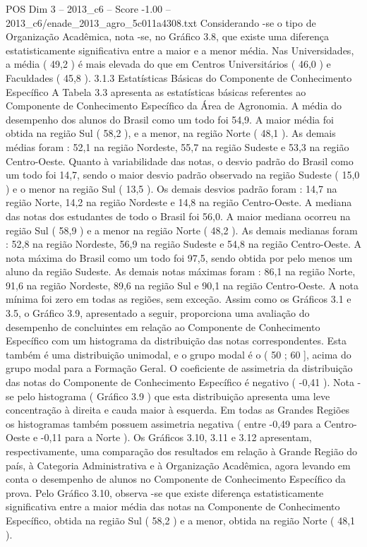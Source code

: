 \begin{textsample}{POS Dim 3 – 2013\_c6 – Score -1.00 – 2013\_c6/enade\_2013\_agro\_5c011a4308.txt}
Considerando -se o tipo de Organização Acadêmica, nota -se, no Gráfico 3.8, que existe uma diferença estatisticamente significativa entre a maior e a menor média.
Nas Universidades, a média ( 49,2 ) é mais elevada do que em Centros Universitários ( 46,0 ) e Faculdades ( 45,8 ). 3.1.3 Estatísticas Básicas do Componente de Conhecimento Específico A Tabela 3.3 apresenta as estatísticas básicas referentes ao Componente de Conhecimento Específico da Área de Agronomia.
A média do desempenho dos alunos do Brasil como um todo foi 54,9.
A maior média foi obtida na região Sul ( 58,2 ), e a menor, na região Norte ( 48,1 ).
As demais médias foram : 52,1 na região Nordeste, 55,7 na região Sudeste e 53,3 na região Centro-Oeste.
Quanto à variabilidade das notas, o desvio padrão do Brasil como um todo foi 14,7, sendo o maior desvio padrão observado na região Sudeste ( 15,0 ) e o menor na região Sul ( 13,5 ).
Os demais desvios padrão foram : 14,7 na região Norte, 14,2 na região Nordeste e 14,8 na região Centro-Oeste.
A mediana das notas dos estudantes de todo o Brasil foi 56,0.
A maior mediana ocorreu na região Sul ( 58,9 ) e a menor na região Norte ( 48,2 ).
As demais medianas foram : 52,8 na região Nordeste, 56,9 na região Sudeste e 54,8 na região Centro-Oeste.
A nota máxima do Brasil como um todo foi 97,5, sendo obtida por pelo menos um aluno da região Sudeste.
As demais notas máximas foram : 86,1 na região Norte, 91,6 na região Nordeste, 89,6 na região Sul e 90,1 na região Centro-Oeste.
A nota mínima foi zero em todas as regiões, sem exceção.
Assim como os Gráficos 3.1 e 3.5, o Gráfico 3.9, apresentado a seguir, proporciona uma avaliação do desempenho de concluintes em relação ao Componente de Conhecimento Específico com um histograma da distribuição das notas correspondentes.
Esta também é uma distribuição unimodal, e o grupo modal é o ( 50 ; 60 ], acima do grupo modal para a Formação Geral.
O coeficiente de assimetria da distribuição das notas do Componente de Conhecimento Específico é negativo ( -0,41 ).
Nota -se pelo histograma ( Gráfico 3.9 ) que esta distribuição apresenta uma leve concentração à direita e cauda maior à esquerda.
Em todas as Grandes Regiões os histogramas também possuem assimetria negativa ( entre -0,49 para a Centro-Oeste e -0,11 para a Norte ).
Os Gráficos 3.10, 3.11 e 3.12 apresentam, respectivamente, uma comparação dos resultados em relação à Grande Região do país, à Categoria Administrativa e à Organização Acadêmica, agora levando em conta o desempenho de alunos no Componente de Conhecimento Específico da prova.
Pelo Gráfico 3.10, observa -se que existe diferença estatisticamente significativa entre a maior média das notas na Componente de Conhecimento Específico, obtida na região Sul ( 58,2 ) e a menor, obtida na região Norte ( 48,1 ).

\end{textsample}
